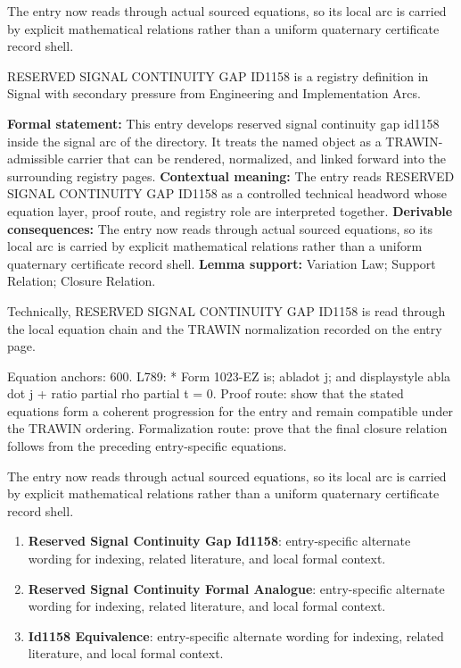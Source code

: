 The entry now reads through actual sourced equations, so its local arc is carried by explicit mathematical relations rather than a uniform quaternary certificate record shell.
\clearpage


\begingroup\small
{}
RESERVED SIGNAL CONTINUITY GAP ID1158 is a registry definition in Signal with secondary pressure from Engineering and Implementation Arcs.

\begingroup\footnotesize\setlength{\emergencystretch}{3em}\sloppy
\textbf{Formal statement:} This entry develops reserved signal continuity gap id1158 inside the signal arc of the directory. It treats the named object as a TRAWIN-admissible carrier that can be rendered, normalized, and linked forward into the surrounding registry pages. \textbf{Contextual meaning:} The entry reads RESERVED SIGNAL CONTINUITY GAP ID1158 as a controlled technical headword whose equation layer, proof route, and registry role are interpreted together. \textbf{Derivable consequences:} The entry now reads through actual sourced equations, so its local arc is carried by explicit mathematical relations rather than a uniform quaternary certificate record shell. \textbf{Lemma support:} Variation Law; Support Relation; Closure Relation.\par
\endgroup

Technically, RESERVED SIGNAL CONTINUITY GAP ID1158 is read through the local equation chain and the TRAWIN normalization recorded on the entry page.

Equation anchors: 600. L789: * Form 1023-EZ is; abladot j; and displaystyle abla dot j + ratio partial rho partial t = 0. Proof route: show that the stated equations form a coherent progression for the entry and remain compatible under the TRAWIN ordering. Formalization route: prove that the final closure relation follows from the preceding entry-specific equations.

The entry now reads through actual sourced equations, so its local arc is carried by explicit mathematical relations rather than a uniform quaternary certificate record shell.
\endgroup

\begin{enumerate}[leftmargin=1.6em,itemsep=6pt,topsep=4pt]
\item \textbf{Reserved Signal Continuity Gap Id1158}: entry-specific alternate wording for indexing, related literature, and local formal context.
\item \textbf{Reserved Signal Continuity Formal Analogue}: entry-specific alternate wording for indexing, related literature, and local formal context.
\item \textbf{Id1158 Equivalence}: entry-specific alternate wording for indexing, related literature, and local formal context.
\end{enumerate}

